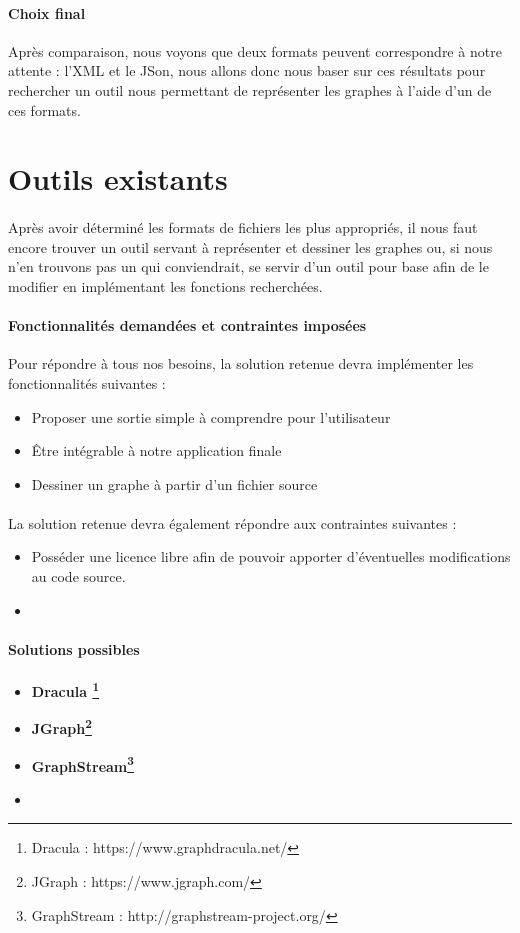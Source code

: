   \paragraph{Choix final}
  Après comparaison, nous voyons que deux formats peuvent correspondre à notre attente : l'XML et le JSon, nous allons donc nous baser sur ces résultats pour rechercher un outil nous permettant de représenter les graphes à l'aide d'un de ces formats.

  \section{Outils existants}
  
  \paragraph{}
  Après avoir déterminé les formats de fichiers les plus appropriés, il nous faut encore trouver un outil servant à représenter et dessiner les graphes ou, si nous n'en trouvons pas un qui conviendrait, se servir d'un outil pour base afin de le modifier en implémentant les fonctions recherchées.
  
  \paragraph{Fonctionnalités demandées et contraintes imposées}
  Pour répondre à tous nos besoins, la solution retenue devra implémenter les fonctionnalités suivantes : 
  \begin{itemize}
  	\item Proposer une sortie simple à comprendre pour l'utilisateur
  	\item Être intégrable à notre application finale
  	\item Dessiner un graphe à partir d'un fichier source
  \end{itemize}
  
  \paragraph{}
  La solution retenue devra également répondre aux contraintes suivantes : 
  \begin{itemize}
  	\item Posséder une licence libre afin de pouvoir apporter d'éventuelles modifications au code source.
  	\item 
  \end{itemize}

  \paragraph{Solutions possibles}
  \begin{itemize}
  	\item \textbf{Dracula \footnote{Dracula : https://www.graphdracula.net/}}
  	\item \textbf{JGraph\footnote{JGraph : https://www.jgraph.com/}}
  	\item \textbf{GraphStream\footnote{GraphStream : http://graphstream-project.org/}}
  	\item 
  \end{itemize}

  
  